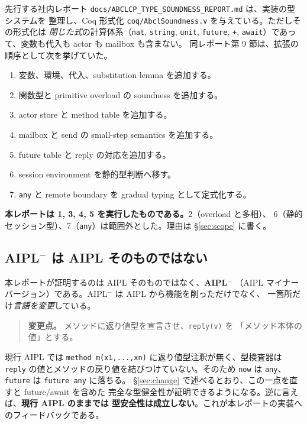 \documentclass[11pt,a4paper]{ltjsarticle}
\theoremstyle{definition}
\theoremstyle{remark}
\begin{document}
先行する社内レポート \verb|docs/ABCLCP_TYPE_SOUNDNESS_REPORT.md| は、実装の型システムを
整理し、Coq 形式化 \verb|coq/AbclSoundness.v| を与えている。ただしその形式化は
\emph{閉じた式}の計算体系（\verb|nat|, \verb|string|, \verb|unit|, \verb|future|,
\verb|+|, \verb|await|）であって、変数も代入も actor も mailbox も含まない。
同レポート第 9 節は、拡張の順序として次を挙げていた。

\begin{enumerate}
\item 変数、環境、代入、substitution lemma を追加する。
\item 関数型と primitive overload の soundness を追加する。
\item actor store と method table を追加する。
\item mailbox と send の small-step semantics を追加する。
\item future table と reply の対応を追加する。
\item session environment を静的型判断へ移す。
\item \verb|any| と remote boundary を gradual typing として定式化する。
\end{enumerate}

\textbf{本レポートは 1, 3, 4, 5 を実行したものである。}2（overload と多相）、
6（静的セッション型）、7（\verb|any|）は範囲外とした。理由は \S\ref{sec:scope} に書く。

\subsection{AIPL$^-$ は AIPL そのものではない}

本レポートが証明するのは AIPL そのものではなく、\textbf{AIPL$^-$}
（AIPL マイナーバージョン）である。AIPL$^-$ は AIPL から機能を削っただけでなく、
一箇所だけ\emph{言語を変更}している。

\begin{quote}
\textbf{変更点。} メソッドに返り値型を宣言させ、\verb|reply(v)| を
「メソッド本体の値」とする。
\end{quote}

現行 AIPL では \verb|method m(x1,...,xn)| に返り値型注釈が無く、型検査器は
\verb|reply| の値とメソッドの戻り値を結びつけていない。そのため
\verb|now| は \verb|any|、\verb|future| は \verb|future any| に落ちる。
\S\ref{sec:change} で述べるとおり、この一点を直すと future/await を含めた
完全な型健全性が証明できるようになる。逆に言えば、\textbf{現行 AIPL のままでは
型安全性は成立しない}。これが本レポートの実装へのフィードバックである。
\end{document}
